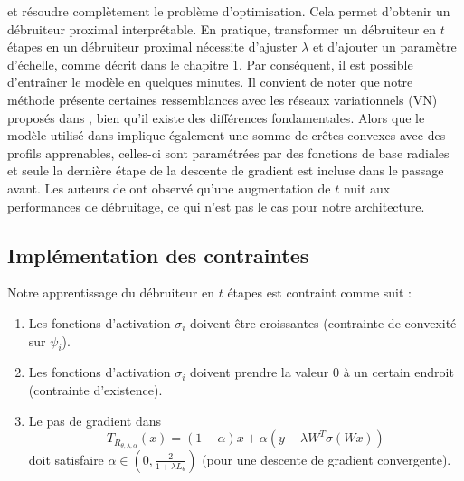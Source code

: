 \documentclass[a4paper, 12pt]{report} %
\begin{document}
\] et résoudre complètement le problème d'optimisation. Cela permet d'obtenir un débruiteur proximal interprétable. En pratique, transformer un débruiteur en \( t \) étapes en un débruiteur proximal nécessite d'ajuster \( \lambda \) et d'ajouter un paramètre d'échelle, comme décrit dans le chapitre 1. Par conséquent, il est possible d'entraîner le modèle en quelques minutes. Il convient de noter que notre méthode présente certaines ressemblances avec les réseaux variationnels (VN) proposés dans \cite{kobler2017variational}, bien qu'il existe des différences fondamentales. Alors que le modèle utilisé dans \cite{kobler2017variational} implique également une somme de crêtes convexes avec des profils apprenables, celles-ci sont paramétrées par des fonctions de base radiales et seule la dernière étape de la descente de gradient est incluse dans le passage avant. Les auteurs de \cite{kobler2017variational} ont observé qu'une augmentation de \( t \) nuit aux performances de débruitage, ce qui n'est pas le cas pour notre architecture.
\subsection{Implémentation des contraintes}Notre apprentissage du débruiteur en \( t \) étapes est contraint comme suit :
\begin{enumerate}
    \item Les fonctions d'activation \( \sigma_i \) doivent être croissantes (contrainte de convexité sur \( \psi_i \)).
    \item Les fonctions d'activation \( \sigma_i \) doivent prendre la valeur 0 à un certain endroit (contrainte d'existence).
    \item Le pas de gradient dans \[
T_{R_{\theta, \lambda, \alpha}}(x) = (1 - \alpha)x + \alpha \left( y - \lambda W^T \sigma(Wx) \right)
\] doit satisfaire \( \alpha \in \left(0, \frac{2}{1 + \lambda L_\theta}\right) \) (pour une descente de gradient convergente).
\end{enumerate}
\end{document}
